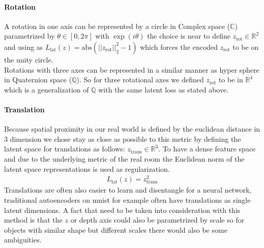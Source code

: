 \documentclass[10pt,a4paper]{article}
\newcommand{\rot}{\ensuremath{\text{rot}\xspace}}
\newcommand{\trans}{\ensuremath{\text{trans}\xspace}}
\begin{document}
\paragraph{Rotation} A rotation in one axis can be represented by a circle in Complex space ($\mathbb{C}$) parametrized by $\theta \in [0, 2 \pi]$ with $\exp(i \theta)$ the choice  is near to define $z_{\rot} \in \mathbb{R}^2$ and using as $L_{\text{lat}}(z) = \text{abs} (||z_{\rot}||_2^2 -1)$ which forces the encoded $z_{\rot}$ to be on the unity circle. \\ 
Rotations with three axes can be represented in a similar manner as hyper sphere in Quaternion space ($\mathbb{Q}$). So for three rotational axes we defined $z_{\rot}$ to be in $\mathbb{R}^4$ which is a generalization of $\mathbb{Q}$ with the same latent loss as stated above.\\
\paragraph{Translation} Because spatial proximity in our real world is defined by the euclidean distance in 3 dimension we chose stay as close as possible to this metric by defining the latent space for translations as follows: $z_{\trans} \in \mathbb{R}^3$. To have a dense feature space and due to the underlying metric of the real room the Euclidean norm of the latent space representations is used as regularization.
\begin{equation}
 \begin{aligned}
L_{\text{lat}}(z) = z_{\trans}^2
\end{aligned}
\end{equation}
Translations are often also easier to learn and disentangle for a neural network, traditional autoencoders on mnist for example often have translations as single latent dimensions. A fact that need to be taken into consideration with this method is that the $z$ or depth axis could also be parametrized by scale so for objects with similar shape but different scales there would also be some ambiguities.

\newpage
\end{document}
